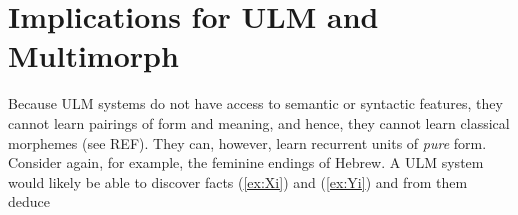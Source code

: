 



\section{Implications for \ac{ULM}  and Multimorph}

Because \ac{ULM} systems do not have access to
semantic or syntactic features, they cannot learn pairings of form and meaning, 
and hence, they cannot learn classical morphemes (see REF). 
They can, however, learn recurrent units of \emph{pure} form. 
Consider again, 
for example, the feminine endings of Hebrew. A \ac{ULM} system would likely be 
able to discover facts (\ref{ex:Xi}) and (\ref{ex:Yi}) and from them deduce 

